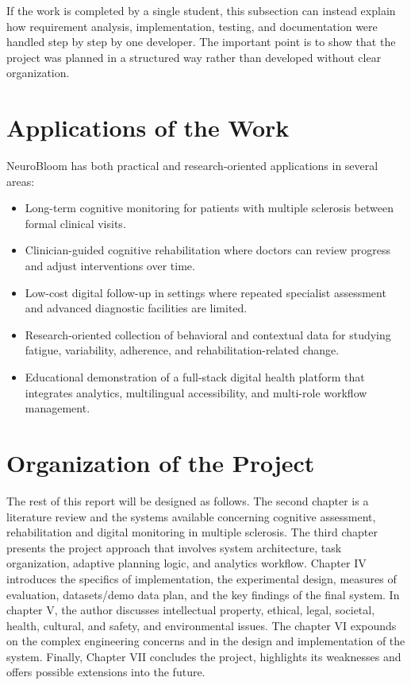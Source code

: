 \documentclass[12pt,a4paper]{report}
\begin{document}
If the work is completed by a single student, this subsection can instead explain how requirement analysis, implementation, testing, and documentation were handled step by step by one developer. The important point is to show that the project was planned in a structured way rather than developed without clear organization.

\section{Applications of the Work}
NeuroBloom has both practical and research-oriented applications in several areas:

\begin{itemize}[leftmargin=0.6in]
\item Long-term cognitive monitoring for patients with multiple sclerosis between formal clinical visits.
\item Clinician-guided cognitive rehabilitation where doctors can review progress and adjust interventions over time.
\item Low-cost digital follow-up in settings where repeated specialist assessment and advanced diagnostic facilities are limited.
\item Research-oriented collection of behavioral and contextual data for studying fatigue, variability, adherence, and rehabilitation-related change.
\item Educational demonstration of a full-stack digital health platform that integrates analytics, multilingual accessibility, and multi-role workflow management.
\end{itemize}

\section{Organization of the Project}
The rest of this report will be designed as follows. The second chapter is a literature review and the systems available concerning cognitive assessment, rehabilitation and digital monitoring in multiple sclerosis. The third chapter presents the project approach that involves system architecture, task organization, adaptive planning logic, and analytics workflow. Chapter IV introduces the specifics of implementation, the experimental design, measures of evaluation, datasets/demo data plan, and the key findings of the final system. In chapter V, the author discusses intellectual property, ethical, legal, societal, health, cultural, and safety, and environmental issues. The chapter VI expounds on the complex engineering concerns and in the design and implementation of the system. Finally, Chapter VII concludes the project, highlights its weaknesses and offers possible extensions into the future.
\end{document}
